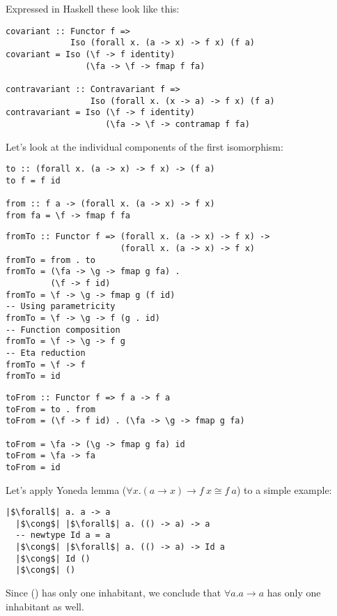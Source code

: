 \documentclass[tikz]{beamer}
\theoremstyle{definition}
\begin{document}
\begin{frame}[fragile]
Expressed in Haskell these look like this:
\begin{verbatim}
covariant :: Functor f =>
             Iso (forall x. (a -> x) -> f x) (f a)
covariant = Iso (\f -> f identity)
                (\fa -> \f -> fmap f fa)

contravariant :: Contravariant f =>
                 Iso (forall x. (x -> a) -> f x) (f a)
contravariant = Iso (\f -> f identity)
                    (\fa -> \f -> contramap f fa)
\end{verbatim}
\end{frame}

\begin{frame}[fragile]
Let's look at the individual components of the first isomorphism:
\begin{verbatim}
to :: (forall x. (a -> x) -> f x) -> (f a)
to f = f id

from :: f a -> (forall x. (a -> x) -> f x)
from fa = \f -> fmap f fa
\end{verbatim}
\end{frame}


\begin{frame}[fragile]
\begin{verbatim}
fromTo :: Functor f => (forall x. (a -> x) -> f x) ->
                       (forall x. (a -> x) -> f x)
fromTo = from . to
fromTo = (\fa -> \g -> fmap g fa) .
         (\f -> f id)
fromTo = \f -> \g -> fmap g (f id)
-- Using parametricity
fromTo = \f -> \g -> f (g . id)
-- Function composition
fromTo = \f -> \g -> f g
-- Eta reduction
fromTo = \f -> f
fromTo = id
\end{verbatim}
\end{frame}

\begin{frame}[fragile]
\begin{verbatim}
toFrom :: Functor f => f a -> f a
toFrom = to . from
toFrom = (\f -> f id) . (\fa -> \g -> fmap g fa)

toFrom = \fa -> (\g -> fmap g fa) id
toFrom = \fa -> fa
toFrom = id
\end{verbatim}
\end{frame}

\begin{frame}[fragile]
Let's apply Yoneda lemma ($\forall x. (a \to x) \to f~x \cong f~a$) to a simple example:

\begin{verbatim}
|$\forall$| a. a -> a
  |$\cong$| |$\forall$| a. (() -> a) -> a
  -- newtype Id a = a
  |$\cong$| |$\forall$| a. (() -> a) -> Id a
  |$\cong$| Id ()
  |$\cong$| ()
\end{verbatim}

Since () has only one inhabitant, we conclude that $\forall a. a \to a$ has only one inhabitant as well.
\end{frame}
\end{document}
